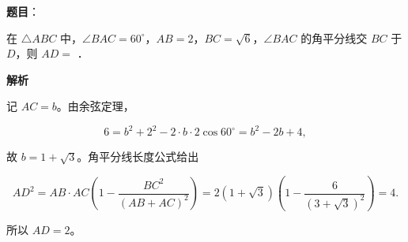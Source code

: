 \begin{answer}

\textbf{题目}：

在 $\triangle ABC$ 中，$\angle BAC=60^\circ$，$AB=2$，$BC=\sqrt6$，$\angle BAC$ 的角平分线交 $BC$ 于 $D$，则 $AD=$ \gkblank{}．

\textbf{解析}

记 $AC=b$。由余弦定理，

\nopagebreak[4]
\[
6=b^2+2^2-2\cdot b\cdot2\cos60^\circ=b^2-2b+4,
\]

故 $b=1+\sqrt3$。角平分线长度公式给出

\nopagebreak[4]
\[
AD^2=AB\cdot AC\left(1-\frac{BC^2}{(AB+AC)^2}\right)
=2(1+\sqrt3)\left(1-\frac6{(3+\sqrt3)^2}\right)=4.
\]

所以 $AD=2$。


\par\medskip

\end{answer}

